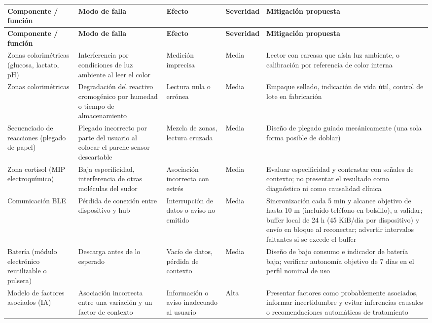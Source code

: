 {\footnotesize
\renewcommand{\arraystretch}{1.2}
\begin{longtable}{|>{\raggedright\arraybackslash}p{}|>{\raggedright\arraybackslash}p{}|>{\raggedright\arraybackslash}p{}|>{\raggedright\arraybackslash}p{}|>{\raggedright\arraybackslash}p{}|}
\hline
\textbf{Componente / función} & \textbf{Modo de falla} & \textbf{Efecto} & \textbf{Severidad} & \textbf{Mitigación propuesta} \\
\hline
\endfirsthead
\hline
\textbf{Componente / función} & \textbf{Modo de falla} & \textbf{Efecto} & \textbf{Severidad} & \textbf{Mitigación propuesta} \\
\hline
\endhead
Zonas colorimétricas (glucosa, lactato, pH) & Interferencia por condiciones de luz ambiente al leer el color & Medición imprecisa & Media & Lector con carcasa que aísla luz ambiente, o calibración por referencia de color interna \\
\hline
Zonas colorimétricas & Degradación del reactivo cromogénico por humedad o tiempo de almacenamiento & Lectura nula o errónea & Media & Empaque sellado, indicación de vida útil, control de lote en fabricación \\
\hline
Secuenciado de reacciones (plegado de papel) & Plegado incorrecto por parte del usuario al colocar el parche sensor descartable & Mezcla de zonas, lectura cruzada & Media & Diseño de plegado guiado mecánicamente (una sola forma posible de doblar) \\
\hline
Zona cortisol (MIP electroquímico) & Baja especificidad, interferencia de otras moléculas del sudor & Asociación incorrecta con estrés & Media & Evaluar especificidad y contrastar con señales de contexto; no presentar el resultado como diagnóstico ni como causalidad clínica \\
\hline
Comunicación BLE & Pérdida de conexión entre dispositivo y hub & Interrupción de datos o aviso no emitido & Media & Sincronización cada 5 min y alcance objetivo de hasta 10 m (incluido teléfono en bolsillo), a validar; buffer local de 24 h (45 KiB/día por dispositivo) y envío en bloque al reconectar; advertir intervalos faltantes si se excede el buffer \\
\hline
Batería (módulo electrónico reutilizable o pulsera) & Descarga antes de lo esperado & Vacío de datos, pérdida de contexto & Media & Diseño de bajo consumo e indicador de batería baja; verificar autonomía objetivo de 7 días en el perfil nominal de uso \\
\hline
Modelo de factores asociados (IA) & Asociación incorrecta entre una variación y un factor de contexto & Información o aviso inadecuado al usuario & Alta & Presentar factores como probablemente asociados, informar incertidumbre y evitar inferencias causales o recomendaciones automáticas de tratamiento \\
\hline
\end{longtable}
}


